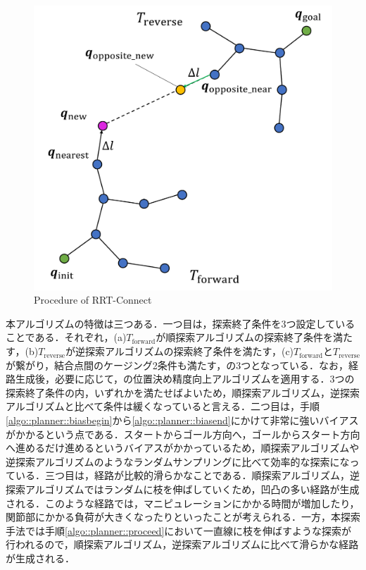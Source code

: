 \documentclass[a4paper,twoside,12pt,papersize, dvipdfmx]{iirthesis}
\begin{document}
\begin{figure}[b]
\centering
\includegraphics[width=0.6\hsize]{fig/3-new-planner/RRTConnect.pdf}
\caption{Procedure of RRT-Connect}
\label{fig::planner::rrtconnect}
\end{figure}

本アルゴリズムの特徴は三つある．一つ目は，探索終了条件を3つ設定していることである．それぞれ，(a)$T_{\mathrm {forward}}$が順探索アルゴリズムの探索終了条件を満たす，(b)$T_{\mathrm {reverse}}$が逆探索アルゴリズムの探索終了条件を満たす，(c)$T_{\mathrm {forward}}$と$T_{\mathrm {reverse}}$が繋がり，結合点間のケージング2条件も満たす，の3つとなっている．なお，経路生成後，必要に応じて，の位置決め精度向上アルゴリズムを適用する．3つの探索終了条件の内，いずれかを満たせばよいため，順探索アルゴリズム，逆探索アルゴリズムと比べて条件は緩くなっていると言える．二つ目は，手順\ref{algo::planner::biasbegin}から\ref{algo::planner::biasend}にかけて非常に強いバイアスがかかるという点である．スタートからゴール方向へ，ゴールからスタート方向へ進めるだけ進めるというバイアスがかかっているため，順探索アルゴリズムや逆探索アルゴリズムのようなランダムサンプリングに比べて効率的な探索になっている．三つ目は，経路が比較的滑らかなことである．順探索アルゴリズム，逆探索アルゴリズムではランダムに枝を伸ばしていくため，凹凸の多い経路が生成される．このような経路では，マニピュレーションにかかる時間が増加したり，関節部にかかる負荷が大きくなったりといったことが考えられる．一方，本探索手法では手順\ref{algo::planner::proceed}において一直線に枝を伸ばすような探索が行われるので，順探索アルゴリズム，逆探索アルゴリズムに比べて滑らかな経路が生成される．
\end{document}

